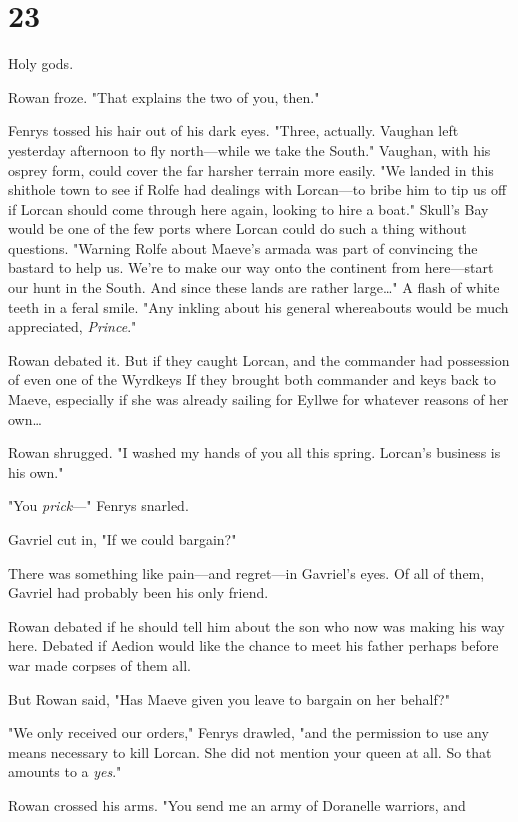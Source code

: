 
\chapter{23}

Holy gods.

Rowan froze. "That explains the two of you, then."

Fenrys tossed his hair out of his dark eyes. "Three, actually. Vaughan left yesterday afternoon to fly north---while we take the South." Vaughan, with his osprey form, could cover the far harsher terrain more easily. "We landed in this shithole town to see if Rolfe had dealings with Lorcan---to bribe him to tip us off if Lorcan should come through here again, looking to hire a boat." Skull's Bay would be one of the few ports where Lorcan could do such a thing without questions. "Warning Rolfe about Maeve's armada was part of convincing the bastard to help us. We're to make our way onto the continent from here---start our hunt in the South. And since these lands are rather large\ldots" A flash of white teeth in a feral smile. "Any inkling about his general whereabouts would be much appreciated, \emph{Prince}."

Rowan debated it. But if they caught Lorcan, and the commander had possession of even one of the Wyrdkeys  If they brought both commander and keys back to Maeve, especially if she was already sailing for Eyllwe for whatever reasons of her own\ldots{}

Rowan shrugged. "I washed my hands of you all this spring. Lorcan's business is his own."

"You \emph{prick}---" Fenrys snarled.

Gavriel cut in, "If we could bargain?"

There was something like pain---and regret---in Gavriel's eyes. Of all of them, Gavriel had probably been his only friend.

Rowan debated if he should tell him about the son who now was making his way here. Debated if Aedion would like the chance to meet his father
 perhaps before war made corpses of them all.

But Rowan said, "Has Maeve given you leave to bargain on her behalf?"

"We only received our orders," Fenrys drawled, "and the permission to use any means necessary to kill Lorcan. She did not mention your queen at all. So that amounts to a \emph{yes}."

Rowan crossed his arms. "You send me an army of Doranelle warriors, and

